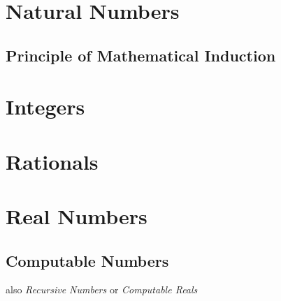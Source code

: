 \documentclass{article}
\begin{document}
\section{Natural Numbers}\label{sec:natural_number}

\subsection{Principle of Mathematical Induction}
\label{subsec:induction_principle}



\section{Integers}\label{sec:integer}



\section{Rationals}\label{sec:rational}



\section{Real Numbers}\label{sec:real_number}

\subsection{Computable Numbers}\label{subsec:computable_real}

also \emph{Recursive Numbers} or \emph{Computable Reals}
\end{document}
